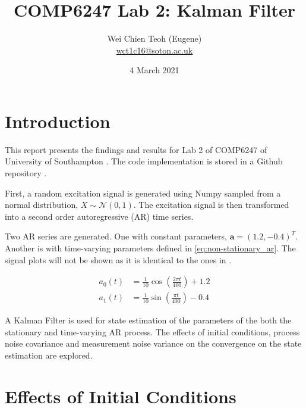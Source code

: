 \documentclass{article}
\title{COMP6247 Lab 2: Kalman Filter}
\author{Wei Chien Teoh (Eugene)\\\bigskip \href{mailto:wct1c16@soton.ac.uk}{wct1c16@soton.ac.uk}}
\date{4 March 2021}
\begin{document}
\maketitle

\section{Introduction}

This report presents the findings and results for Lab 2 of COMP6247 of University of Southampton \cite{lab2}. The code implementation is stored in a Github repository \cite{github}.

First, a random excitation signal is generated using Numpy sampled from a normal distribution, $X \sim \mathcal{N}(0, 1)$. The excitation signal is then transformed into a second order autoregressive (AR) time series.

Two AR series are generated. One with constant parameters, $\mathbf{a} = (1.2, -0.4)^T$. Another is with time-varying parameters defined in \cref{eq:non-stationary_ar}. The signal plots will not be shown as it is identical to the ones in \cite{lab2}.

\begin{subequations}
    \label{eq:non-stationary_ar}
    \begin{align}
        a_0(t) &= \frac{1}{10} \cos(\frac{2 \pi t}{400}) + 1.2 \\
        a_1(t) &= \frac{1}{10} \sin(\frac{\pi t}{400}) - 0.4
    \end{align} 
\end{subequations}


A Kalman Filter is used for state estimation of the parameters of the both the stationary and time-varying AR process. The effects of initial conditions, process noise covariance and measurement noise variance on the convergence on the state estimation are explored.


\section{Effects of Initial Conditions}
\end{document}

